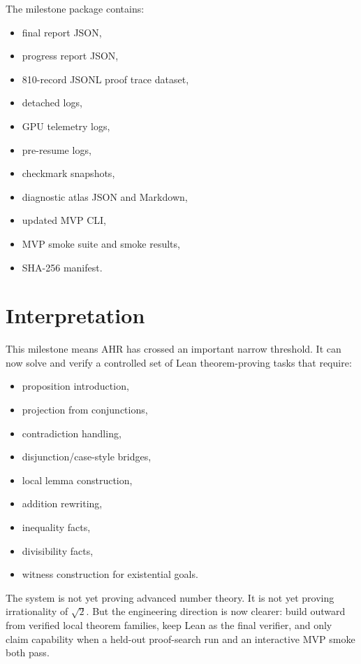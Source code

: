 \documentclass[11pt]{article}
\begin{document}
The milestone package contains:

\begin{itemize}
  \item final report JSON,
  \item progress report JSON,
  \item 810-record JSONL proof trace dataset,
  \item detached logs,
  \item GPU telemetry logs,
  \item pre-resume logs,
  \item checkmark snapshots,
  \item diagnostic atlas JSON and Markdown,
  \item updated MVP CLI,
  \item MVP smoke suite and smoke results,
  \item SHA-256 manifest.
\end{itemize}

\section{Interpretation}

This milestone means AHR has crossed an important narrow threshold. It can now solve and verify a controlled set of
Lean theorem-proving tasks that require:

\begin{itemize}
  \item proposition introduction,
  \item projection from conjunctions,
  \item contradiction handling,
  \item disjunction/case-style bridges,
  \item local lemma construction,
  \item addition rewriting,
  \item inequality facts,
  \item divisibility facts,
  \item witness construction for existential goals.
\end{itemize}

The system is not yet proving advanced number theory. It is not yet proving irrationality of $\sqrt{2}$. But the
engineering direction is now clearer: build outward from verified local theorem families, keep Lean as the final
verifier, and only claim capability when a held-out proof-search run and an interactive MVP smoke both pass.
\end{document}

